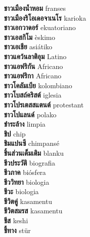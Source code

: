 \textbf{ ชาวเมืองน้ำหอม  } franses \\
\textbf{ ชาวเมืองริโอเดอจาเนโร  } karioka \\
\textbf{ ชาวเอกวาดอร์  } ekuatoriano \\
\textbf{ ชาวเอสกิโม  } èskimo \\
\textbf{ ชาวเอเชีย  } asiátiko \\
\textbf{ ชาวแคว้นลาติอุม  } Latino \\
\textbf{ ชาวแอฟริกัน  } Africano \\
\textbf{ ชาวแอฟริกา  } Africano \\
\textbf{ ชาวโคลัมเบีย  } kolombiano \\
\textbf{ ชาวโบสถ์คริสต์  } iglesia \\
\textbf{ ชาวโปรเตสสแตนต์  } protestant \\
\textbf{ ชาวโปแลนด์  } polako \\
\textbf{ ชำระล้าง  } limpia \\
\textbf{ ชิป  } chip \\
\textbf{ ชิมแปนซี  } chimpansé \\
\textbf{ ชิ้นส่วนเต็มเติม  } blanku \\
\textbf{ ชีวประวัติ  } biografia \\
\textbf{ ชีวภาค  } biósfera \\
\textbf{ ชีววิทยา  } biologia \\
\textbf{ ชีวะ  } biologia \\
\textbf{ ชีวิตคู่  } kasamentu \\
\textbf{ ชีวิตสมรส  } kasamentu \\
\textbf{ ชีส  } keshi \\
\textbf{ ชี้ทาง  } stür \\

